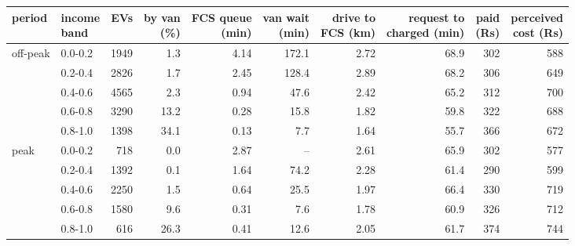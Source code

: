 \begin{tabular}{@{}llrrrrrrrr@{}}
\toprule
period & \shortstack[l]{income\\band} & EVs & \shortstack[r]{by van\\(\%)} & \shortstack[r]{FCS queue\\(min)} & \shortstack[r]{van wait\\(min)} & \shortstack[r]{drive to\\FCS (km)} & \shortstack[r]{request to\\charged (min)} & \shortstack[r]{paid\\(Rs)} & \shortstack[r]{perceived\\cost (Rs)} \\
\midrule
off-peak & 0.0-0.2 & 1949 & 1.3 & 4.14 & 172.1 & 2.72 & 68.9 & 302 & 588 \\
 & 0.2-0.4 & 2826 & 1.7 & 2.45 & 128.4 & 2.89 & 68.2 & 306 & 649 \\
 & 0.4-0.6 & 4565 & 2.3 & 0.94 & 47.6 & 2.42 & 65.2 & 312 & 700 \\
 & 0.6-0.8 & 3290 & 13.2 & 0.28 & 15.8 & 1.82 & 59.8 & 322 & 688 \\
 & 0.8-1.0 & 1398 & 34.1 & 0.13 & 7.7 & 1.64 & 55.7 & 366 & 672 \\
\midrule
peak & 0.0-0.2 & 718 & 0.0 & 2.87 & -- & 2.61 & 65.9 & 302 & 577 \\
 & 0.2-0.4 & 1392 & 0.1 & 1.64 & 74.2 & 2.28 & 61.4 & 290 & 599 \\
 & 0.4-0.6 & 2250 & 1.5 & 0.64 & 25.5 & 1.97 & 66.4 & 330 & 719 \\
 & 0.6-0.8 & 1580 & 9.6 & 0.31 & 7.6 & 1.78 & 60.9 & 326 & 712 \\
 & 0.8-1.0 & 616 & 26.3 & 0.41 & 12.6 & 2.05 & 61.7 & 374 & 744 \\
\bottomrule
\end{tabular}

